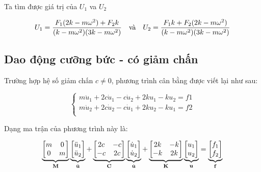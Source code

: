 Ta tìm được giá trị của $U_1$ va $U_2$

\begin{equation}
    U_1 = \frac{F_1(2k-m\omega^2)+F_2k}{(k-m\omega^2)(3k-m\omega^2)} \quad \hbox{và} \quad U_2 = \frac{F_1k+F_2(2k-m\omega^2)}{(k-m\omega^2)(3k-m\omega^2)}
\end{equation}

\subsection{Dao động cưỡng bức - có giảm chấn}

Trường hợp hệ số giảm chấn  $c \neq 0$, phương trình cân bằng được viết lại như sau:

\begin{equation}\label{eq_PT2dofs_c}
    \begin{cases}
        m \ddot{u}_1 + 2c\dot{u}_1 - c\dot{u}_2 + 2ku_1 - ku_2 = f1 \\
        m \ddot{u}_2 + 2c\dot{u}_2 - c\dot{u}_1 + 2ku_2 - ku_1 = f2 \\
    \end{cases}
\end{equation}

Dạng ma trận của phương trình này là:

\begin{equation}\label{eq_PT2dofs_c_matrix}
    \underbrace{\begin{bmatrix}
        m & 0\\ 0 & m
    \end{bmatrix}}_{\bf M}\underbrace{\begin{bmatrix}
        \ddot{u}_1 \\ \ddot{u}_2
    \end{bmatrix}}_{\ddot{\bf u}} + \underbrace{\begin{bmatrix}
        2c & -c \\ -c & 2c
    \end{bmatrix}}_{\bf C}\underbrace{\begin{bmatrix}
        \dot{u}_1 \\ \dot{u}_2
    \end{bmatrix}}_{\dot{\bf u}} +\underbrace{\begin{bmatrix}
        2k & -k \\ -k & 2k
    \end{bmatrix}}_{\bf K} \underbrace{\begin{bmatrix}
        u_1 \\ u_2
    \end{bmatrix}}_{\bf u} = \underbrace{\begin{bmatrix}
        f_1 \\ f_2
    \end{bmatrix}}_{\bf f} 
\end{equation}

